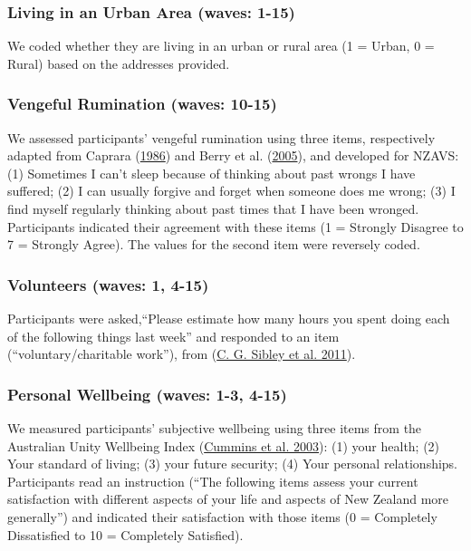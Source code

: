 \documentclass[
  singlecolumn]{report}
\begin{document}
\hypertarget{living-in-an-urban-area-waves-1-15}{%
\subsubsection{Living in an Urban Area (waves:
1-15)}\label{living-in-an-urban-area-waves-1-15}}

We coded whether they are living in an urban or rural area (1 = Urban, 0
= Rural) based on the addresses provided.

\hypertarget{vengeful-rumination-waves-10-15}{%
\subsubsection{Vengeful Rumination (waves:
10-15)}\label{vengeful-rumination-waves-10-15}}

We assessed participants' vengeful rumination using three items,
respectively adapted from Caprara
(\protect\hyperlink{ref-caprara_indicators_1986}{1986}) and Berry et al.
(\protect\hyperlink{ref-berry_forgivingness_2005}{2005}), and developed
for NZAVS: (1) Sometimes I can't sleep because of thinking about past
wrongs I have suffered; (2) I can usually forgive and forget when
someone does me wrong; (3) I find myself regularly thinking about past
times that I have been wronged. Participants indicated their agreement
with these items (1 = Strongly Disagree to 7 = Strongly Agree). The
values for the second item were reversely coded.

\hypertarget{volunteers-waves-1-4-15}{%
\subsubsection{Volunteers (waves: 1,
4-15)}\label{volunteers-waves-1-4-15}}

Participants were asked,``Please estimate how many hours you spent doing
each of the following things last week'' and responded to an item
(``voluntary/charitable work''), from
(\protect\hyperlink{ref-sibley2011}{C. G. Sibley et al. 2011}).

\hypertarget{personal-wellbeing-waves-1-3-4-15}{%
\subsubsection{Personal Wellbeing (waves: 1-3,
4-15)}\label{personal-wellbeing-waves-1-3-4-15}}

We measured participants' subjective wellbeing using three items from
the Australian Unity Wellbeing Index
(\protect\hyperlink{ref-cummins_developing_2003}{Cummins et al. 2003}):
(1) your health; (2) Your standard of living; (3) your future security;
(4) Your personal relationships. Participants read an instruction (``The
following items assess your current satisfaction with different aspects
of your life and aspects of New Zealand more generally'') and indicated
their satisfaction with those items (0 = Completely Dissatisfied to 10 =
Completely Satisfied).
\end{document}
